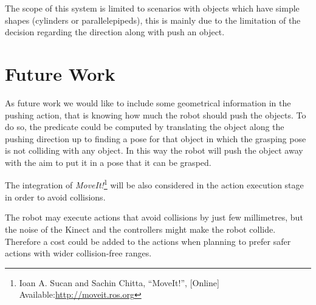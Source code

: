 The scope of this system is limited to scenarios with objects which have simple shapes (cylinders or parallelepipeds), this is mainly due to the limitation of the decision regarding the direction along with push an object.  


\section*{Future Work}
As future work we would like to include some geometrical information in the pushing action, that is knowing how much the robot should push the objects. To do so, the  predicate could be computed by translating the object along the pushing direction up to finding a pose for that object in which the grasping pose is not colliding with any object. In this way the robot will push the object away with the aim to put it in a pose that it can be grasped.

The integration of \textit{MoveIt!}\footnote{Ioan A. Sucan and Sachin Chitta, “MoveIt!”, [Online] Available:\href{http://moveit.ros.org} {\url{http://moveit.ros.org}}} will be also considered in the action execution stage in order to avoid collisions. 

The robot may execute actions that avoid collisions by just few millimetres, but the noise of the Kinect and the controllers might make the robot collide. Therefore a cost could be added to the actions when planning to prefer safer actions with wider collision-free ranges.